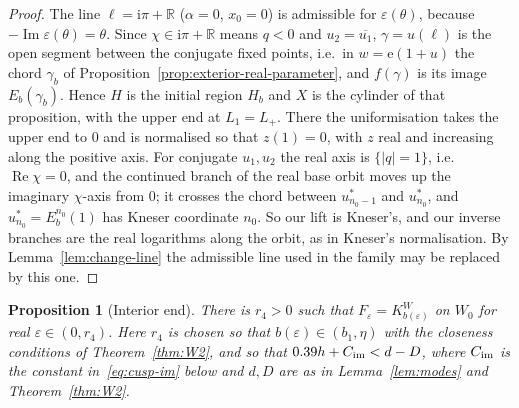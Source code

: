\documentclass[11pt]{amsart}
\newtheorem{proposition}[theorem]{Proposition}
\theoremstyle{definition}
\newcommand{\Kk}{K}
\newcommand{\eee}{\mathrm{e}}
\newcommand{\ii}{\mathrm{i}}
\begin{document}
\begin{proof}
The line $\ell=\ii\pi+\mathbb R$ ($\alpha=0$, $x_0=0$) is admissible for $\varepsilon(\theta)$, because
$-\operatorname{Im}\varepsilon(\theta)=\theta$.  Since $\chi\in\ii\pi+\mathbb R$ means $q<0$ and $u_2=\overline{u_1}$,
$\gamma=u(\ell)$ is the open segment between the conjugate fixed points, i.e.\ in
$w=\eee(1+u)$ the chord $\gamma_b$ of Proposition~\ref{prop:exterior-real-parameter}, and
$f(\gamma)$ is its image $E_b(\gamma_b)$.  Hence $H$ is the initial region $H_b$ and $X$
is the cylinder of that proposition, with the upper end at $L_1=L_+$.  There
the uniformisation takes the upper end to $0$ and is normalised so that
$z(1)=0$, with $z$ real and increasing along the positive axis.  For
conjugate $u_1,u_2$ the real axis is $\{|q|=1\}$, i.e.\ $\operatorname{Re}\chi=0$, and the
continued branch of the real base orbit moves up the imaginary $\chi$-axis
from $0$; it crosses the chord between $u^*_{n_0-1}$ and $u^*_{n_0}$, and
$u^*_{n_0}=E_b^{n_0}(1)$ has Kneser coordinate $n_0$.  So our lift is Kneser's,
and our inverse branches are the real logarithms along the orbit, as in
Kneser's normalisation.  By Lemma~\ref{lem:change-line} the admissible line
used in the family may be replaced by this one.
\end{proof}

\begin{proposition}[Interior end]\label{prop:cusp-interior}
There is $r_4>0$ such that $F_\varepsilon=\Kk^W_{b(\varepsilon)}$ on $W_0$ for real $\varepsilon\in(0,r_4)$.
Here $r_4$ is chosen so that $b(\varepsilon)\in(b_1,\eta)$ with the closeness conditions
of Theorem~\ref{thm:W2}, and so that $0.39h+C_{\rm im}<d-D$, where $C_{\rm im}$ is the
constant in~\eqref{eq:cusp-im} below and $d,D$ are as in Lemma~\ref{lem:modes}
and Theorem~\ref{thm:W2}.
\end{proposition}
\end{document}
